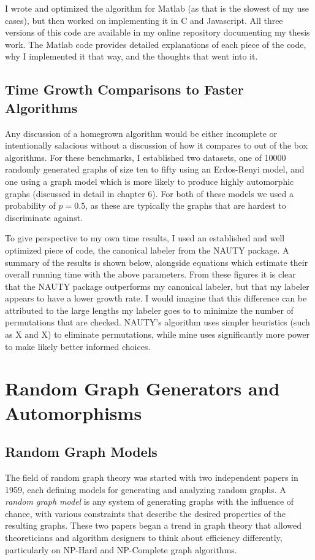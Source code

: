 \documentclass[11pt,a4paper]{report}
\begin{document}
I wrote and optimized the algorithm for Matlab (as that is the slowest of my use cases), but then worked on implementing it in C and Javascript.
All three versions of this code are available in my online repository documenting my thesis work.
The Matlab code provides detailed explanations of each piece of the code, why I implemented it that way, and the thoughts that went into it.

\section{Time Growth Comparisons to Faster Algorithms}
Any discussion of a homegrown algorithm would be either incomplete or intentionally salacious without a discussion of how it compares to out of the box algorithms.
For these benchmarks, I established two datasets, one of 10000 randomly generated graphs of size ten to fifty using an Erdos-Renyi model, and one using a graph model which is more likely to produce highly automorphic graphs (discussed in detail in chapter 6).
For both of these models we used a probability of $p=0.5$, as these are typically the graphs that are hardest to discriminate against.

To give perspective to my own time results, I used an established and well optimized piece of code, the canonical labeler from the NAUTY package.
A summary of the results is shown below, alongside equations which estimate their overall running time with the above parameters.
From these figures it is clear that the NAUTY package outperforms my canonical labeler, but that my labeler appears to have a lower growth rate.
I would imagine that this difference can be attributed to the large lengths my labeler goes to to minimize the number of permutations that are checked.
NAUTY's algorithm uses simpler heuristics (such as X and X) to eliminate permutations, while mine uses significantly more power to make likely better informed choices.



\chapter{Random Graph Generators and Automorphisms}

\section{Random Graph Models}

The field of random graph theory was started with two independent papers in 1959, each defining models for generating and analyzing random graphs.
A \emph{random graph model} is any system of generating graphs with the influence of chance, with various constraints that describe the desired properties of the resulting graphs.
These two papers began a trend in graph theory that allowed theoreticians and algorithm designers to think about efficiency differently, particularly on NP-Hard and NP-Complete graph algorithms.
\end{document}
